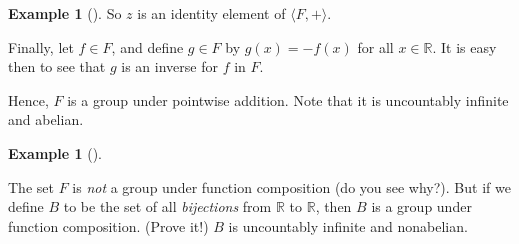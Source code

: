 \documentclass[10pt,]{book}
\theoremstyle{plain}
\theoremstyle{definition}
\theoremstyle{definition}
\theoremstyle{definition}
\newtheorem{example}[theorem]{Example}
\theoremstyle{definition}
\numberwithin{equation}{section}
\def\R{\mathbb{R}}
\begin{document}
\begin{example}[]
\par

        So \(z\) is an identity element of \(\langle F,+\rangle\).
\par

        Finally, let \(f\in F\), and define \(g\in F\) by \(g(x)=-f(x)\) for all \(x\in \R\). It is easy then to see that \(g\) is an inverse for \(f\) in \(F\).
\par

        Hence, \(F\) is a group under pointwise addition. Note that it is uncountably infinite and abelian.
\end{example}
\begin{example}[]\label{example-22}

        The set \(F\) is \emph{not} a group under function composition (do you see why?). But if we define \(B\) to be the set of all \emph{bijections} from \(\R\) to \(\R\), then \(B\) is a group under function composition. (Prove it!) \(B\) is uncountably infinite and nonabelian.
\end{example}
\end{document}
